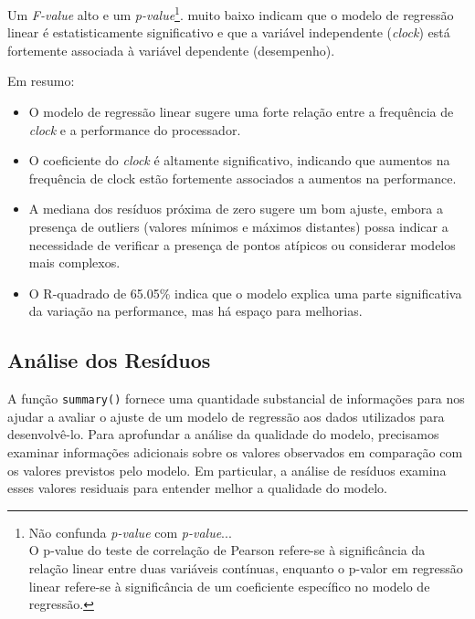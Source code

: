 \documentclass[article]{memoir}
\begin{document}
{	
	Um \textit{F-value} alto e um \textit{p-value}\footnote{Não confunda \textit{p-value} com \textit{p-value}...\\ O p-value do teste de correlação de Pearson refere-se à significância da relação linear entre duas variáveis contínuas, enquanto o p-valor em regressão linear refere-se à significância de um coeficiente específico no modelo de regressão.}. muito baixo indicam que o modelo de regressão linear é estatisticamente significativo e que a variável independente (\textit{clock}) está fortemente associada à variável dependente (desempenho). 
	
Em resumo:

\begin{itemize}
	\item O modelo de regressão linear sugere uma forte relação entre a frequência de \textit{clock} e a performance do processador.
	\item O coeficiente do \textit{clock} é altamente significativo, indicando que aumentos na frequência de clock estão fortemente associados a aumentos na performance.
	\item A mediana dos resíduos próxima de zero sugere um bom ajuste, embora a presença de outliers (valores mínimos e máximos distantes) possa indicar a necessidade de verificar a presença de pontos atípicos ou considerar modelos mais complexos.
	\item O R-quadrado de 65.05\% indica que o modelo explica uma parte significativa da variação na performance, mas há espaço para melhorias.
\end{itemize}


\subsection{Análise dos Resíduos}

A função \texttt{summary()} fornece uma quantidade substancial de informações para nos ajudar a avaliar o ajuste de um modelo de regressão aos dados utilizados para desenvolvê-lo. Para aprofundar a análise da qualidade do modelo, precisamos examinar informações adicionais sobre os valores observados em comparação com os valores previstos pelo modelo. Em particular, a análise de resíduos examina esses valores residuais para entender melhor a qualidade do modelo.

}
\end{document}
